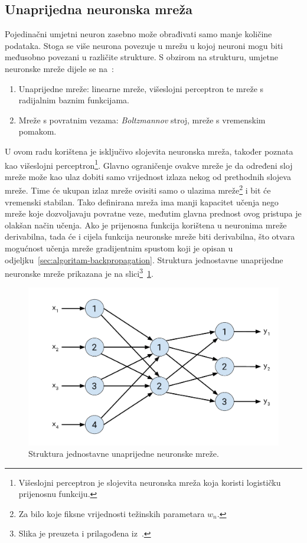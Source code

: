 \subsection{Unaprijedna neuronska mreža}
\label{subsec:unaprijedna-neuronska-mreza}
Pojedinačni umjetni neuron zasebno može obrađivati samo manje količine podataka. Stoga se više neurona povezuje u
mrežu u kojoj neuroni mogu biti međusobno povezani u različite strukture. S obzirom na strukturu, umjetne neuronske
mreže dijele se na\ \citep{cupic2013}:
\begin{enumerate}
    \item Unaprijedne mreže: linearne mreže, višeslojni perceptron te mreže s radijalnim baznim funkcijama.
    \item Mreže s povratnim vezama: \emph{Boltzmannov} stroj, mreže s vremenskim pomakom.
\end{enumerate}
U ovom radu korištena je isključivo slojevita neuronska mreža, također poznata kao višeslojni
perceptron\footnote{Višeslojni perceptron je slojevita neuronska mreža koja koristi logističku prijenosnu funkciju.}.
Glavno ograničenje ovakve mreže je da određeni sloj mreže može kao ulaz dobiti samo vrijednost izlaza nekog od
prethodnih slojeva mreže. Time će ukupan izlaz mreže ovisiti samo o ulazima mreže\footnote{Za bilo koje fiksne
vrijednosti težinskih parametara $w_n$.} i bit će vremenski stabilan. Tako definirana mreža ima manji kapacitet učenja
nego mreže koje dozvoljavaju povratne veze, međutim glavna prednost ovog pristupa je olakšan način učenja. Ako je
prijenosna funkcija korištena u neuronima mreže derivabilna, tada će i cijela funkcija neuronske mreže biti derivabilna,
što otvara mogućnost učenja mreže gradijentnim spustom koji je opisan u odjeljku\ \ref{sec:algoritam-backpropagation}.
Struktura jednostavne unaprijedne neuronske mreže prikazana je na slici\footnote{Slika je preuzeta i prilagođena
iz\ \citep{cupic2013}.}\ \ref{fig:simple-neural-network}.
\begin{figure}[htb]
    \centering
    \includegraphics[width=12cm]{images/chapter3/simple-neural-network.pdf}
    \caption{Struktura jednostavne unaprijedne neuronske mreže.}
    \label{fig:simple-neural-network}
\end{figure}
